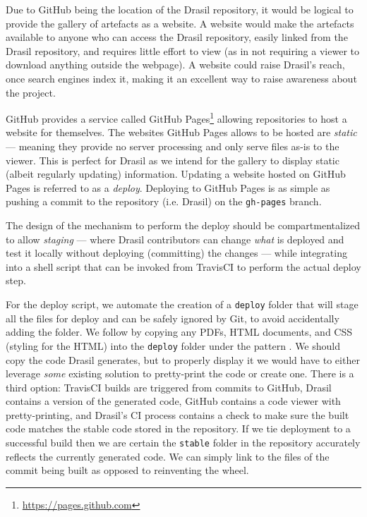 {{{{{Due to GitHub being the location of the Drasil repository, it would be logical to provide the gallery of artefacts as a website. A website would make the artefacts available to anyone who can access the Drasil repository, easily linked from the Drasil repository, and requires little effort to view (as in not requiring a viewer to download anything outside the webpage). A website could raise Drasil's reach, once search engines index it, making it an excellent way to raise awareness about the project.

GitHub provides a service called GitHub Pages\footnote{\url{https://pages.github.com}} allowing repositories to host a website for themselves. The websites GitHub Pages allows to be hosted are \textit{static} --- meaning they provide no server processing and only serve files as-is to the viewer. This is perfect for Drasil as we intend for the gallery to display static (albeit regularly updating) information. Updating a website hosted on GitHub Pages is referred to as a \textit{deploy}. Deploying to GitHub Pages is as simple as pushing a commit to the repository (i.e. Drasil) on the \texttt{gh-pages} branch. 

The design of the mechanism to perform the deploy should be compartmentalized to allow \textit{staging} --- where Drasil contributors can change \textit{what} is deployed and test it locally without deploying (committing) the changes --- while integrating into a shell script that can be invoked from TravisCI to perform the actual deploy step. 

For the deploy script, we automate the creation of a \texttt{deploy} folder that will stage all the files for deploy and can be safely ignored by Git, to avoid accidentally adding the folder. We follow by copying any PDFs, HTML documents, and CSS (styling for the HTML) into the \texttt{deploy} folder under the pattern . We should copy the code Drasil generates, but to properly display it we would have to either leverage \textit{some} existing solution to pretty-print the code or create one. There is a third option: TravisCI builds are triggered from commits to GitHub, Drasil contains a version of the generated code, GitHub contains a code viewer with pretty-printing, and Drasil's CI process contains a check to make sure the built code matches the stable code stored in the repository. If we tie deployment to a successful build then we are certain the \texttt{stable} folder in the repository accurately reflects the currently generated code. We can simply link to the files of the commit being built as opposed to reinventing the wheel.

}}}}}
